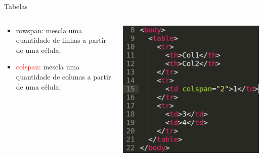 \documentclass{beamer}
\begin{document}
\begin{frame}{Tabelas}
    \begin{columns}
    \begin{column}{0.5 \textwidth}
      \small
     \begin{itemize}
       \item rowspan: mescla uma quantidade de linhas a partir 
	 de uma célula;
      \item \textcolor{red}{colspan}: mescla uma quantidade de colunas a partir 
	de uma célula;
     \end{itemize}
    \end{column}
    
    \begin{column}{0.5\textwidth}
     \includegraphics[height=0.5\paperheight]{fig/aula2/aula4_6.png}
    \end{column}
  \end{columns}
\end{frame}

\end{document}

